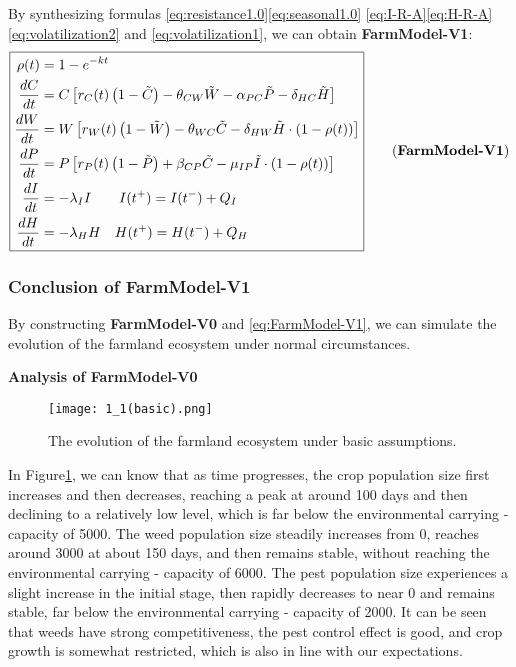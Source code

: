 \documentclass[12pt]{article}  %
\begin{document}
By synthesizing formulas \eqref{eq:resistance1.0}\eqref{eq:seasonal1.0}
\eqref{eq:I-R-A}\eqref{eq:H-R-A}\eqref{eq:volatilization2} and 
\eqref{eq:volatilization1}, we can obtain \textbf{FarmModel-V1}:
\begin{equation}
    \boxed{
        \begin{aligned}
            \rho(t) &= 1 - e^{-k t}\\
            \frac{dC}{dt} &= C \left[ r_C(t) \left( 1 - \tilde{C} \right) - \theta_{CW} \tilde{W} - \alpha_{PC} \tilde{P} - \delta_{HC} \tilde{H} \right]\\
            \frac{dW}{dt} &= W \left[ r_W(t) \left( 1 - \tilde{W} \right) - \theta_{WC} \tilde{C} - \delta_{HW} \tilde{H} \cdot (1 - \rho(t)) \right] \\
            \frac{dP}{dt} &= P \left[ r_P(t) \left( 1 - \tilde{P} \right) + \beta_{CP} \tilde{C} - \mu_{IP} \tilde{I} \cdot (1 - \rho(t)) \right] \\
            \frac{dI}{dt} &= -\lambda_I I\qquad I(t^+) = I(t^-) + Q_I \\
            \frac{dH}{dt} &= -\lambda_H H\quad H(t^+) = H(t^-) + Q_H 
        \end{aligned}
    }
    \tag{\textbf{FarmModel-V1}}\label{eq:FarmModel-V1}
\end{equation}

\subsubsection{Conclusion of FarmModel-V1}
By constructing \textbf{FarmModel-V0} and \ref{eq:FarmModel-V1}, we can 
simulate the evolution of the farmland ecosystem under normal circumstances.

\noindent \textbf{Analysis of FarmModel-V0}

\begin{figure}[htbp]
    \centering
    \texttt{[image: 1\_1(basic).png]}
    \caption{The evolution of the farmland ecosystem under basic assumptions.}
    \label{fig:FarmModel-V0}
\end{figure}

In Figure\ref{fig:FarmModel-V0}, we can know that as 
time progresses, the crop population size first increases and 
then decreases, reaching a peak at around 100 days and then 
declining to a relatively low level, which is far below the 
environmental carrying - capacity of 5000. The weed population 
size steadily increases from 0, reaches around 3000 at about 150 
days, and then remains stable, without reaching the environmental 
carrying - capacity of 6000. The pest population size experiences 
a slight increase in the initial stage, then rapidly decreases to 
near 0 and remains stable, far below the environmental carrying - 
capacity of 2000. It can be seen that weeds have strong 
competitiveness, the pest control effect is good, and crop growth 
is somewhat restricted, which is also in line with our expectations.
\end{document}

